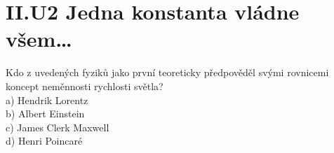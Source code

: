 \documentclass{../../../../style/mkimain}
\begin{document}
\section*{II.U2 Jedna konstanta vládne všem\dots}
\noindent Kdo z uvedených fyziků jako první teoreticky předpověděl svými rovnicemi koncept neměnnosti rychlosti světla? 
\\

a) Hendrik Lorentz
\\

b) Albert Einstein
\\

c) James Clerk Maxwell
\\

d) Henri Poincaré
\end{document}
